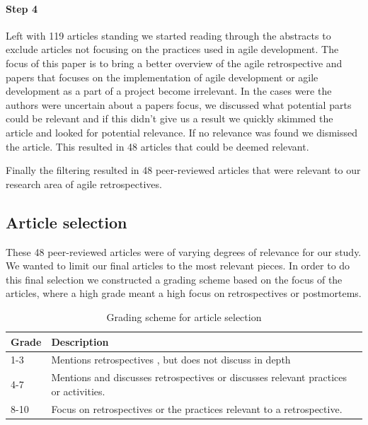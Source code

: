 \documentclass[12pt]{article}
\begin{document}
\paragraph{Step 4}
Left with 119 articles standing we started reading through the abstracts to exclude articles not focusing on the practices used in agile development. The focus of this paper is to bring a better overview of the agile retrospective and papers that focuses on the implementation of agile development or agile development as a part of a project become irrelevant. In the cases were the authors were uncertain about a papers focus, we discussed what potential parts could be relevant and if this didn't give us a result we quickly skimmed the article and looked for potential relevance. If no relevance was found we dismissed the article. This resulted in 48 articles that could be deemed relevant. 

Finally the filtering resulted in 48 peer-reviewed articles that were relevant to our research area of agile retrospectives. 

\subsection{Article selection}
These 48 peer-reviewed articles were of varying degrees of relevance for our study. We wanted to limit our final articles to the most relevant pieces. In order to do this final selection we constructed a grading scheme based on the focus of the articles, where a high grade meant a high focus on retrospectives or postmortems. 

\begin{table}[!h]
	\centering
	\caption{Grading scheme for article selection}
	\label{table:article_grading}
	\label{figure:survey}
	\begin{tabular}{l | p{}}
		\hline
		Grade & Description \\
		\hline
		1-3 & Mentions retrospectives , but does not discuss in depth \\
		4-7 & Mentions and discusses retrospectives  or discusses relevant practices or activities. \\
		8-10 & Focus on retrospectives or the practices relevant to a retrospective. \\
		\hline
	\end{tabular}
\end{table}		
\end{document}
